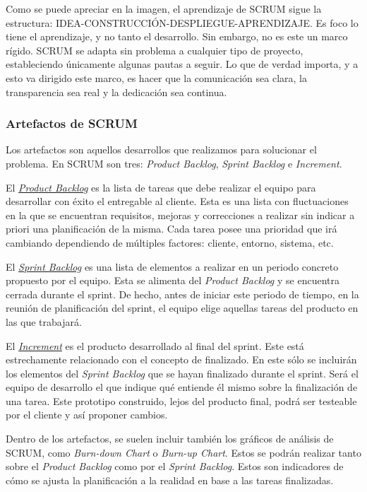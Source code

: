 
Como se puede apreciar en la imagen, el aprendizaje de SCRUM sigue la estructura: IDEA-CONSTRUCCIÓN-DESPLIEGUE-APRENDIZAJE. Es foco lo tiene el aprendizaje, y no tanto el desarrollo. Sin embargo, no es este un marco rígido. SCRUM se adapta sin problema a cualquier tipo de proyecto, estableciendo únicamente algunas pautas a seguir. Lo que de verdad importa, y a esto va dirigido este marco, es hacer que la comunicación sea clara, la transparencia sea real y la dedicación sea continua.

\subsubsection{Artefactos de SCRUM}
Los artefactos son aquellos desarrollos que realizamos para solucionar el problema. En SCRUM son tres: \textit{Product Backlog}, \textit{Sprint Backlog} e \textit{Increment}.

El \underline{\textit{Product Backlog}} es la lista de tareas que debe realizar el equipo para desarrollar con éxito el entregable al cliente. Esta es una lista con fluctuaciones en la que se encuentran requisitos, mejoras y correcciones a realizar sin indicar a priori una planificación de la misma. Cada tarea posee una prioridad que irá cambiando dependiendo de múltiples factores: cliente, entorno, sistema, etc.

El \underline{\textit{Sprint Backlog}} es una lista de elementos a realizar en un periodo concreto propuesto por el equipo. Esta se alimenta del \textit{Product Backlog} y se encuentra cerrada durante el sprint. De hecho, antes de iniciar este periodo de tiempo, en la reunión de planificación del sprint, el equipo elige aquellas tareas del producto en las que trabajará.

El \underline{\textit{Increment}} es el producto desarrollado al final del sprint. Este está estrechamente relacionado con el concepto de finalizado. En este sólo se incluirán los elementos del \textit{Sprint Backlog} que se hayan finalizado durante el sprint. Será el equipo de desarrollo el que indique qué entiende él mismo sobre la finalización de una tarea. Este prototipo construido, lejos del producto final, podrá ser testeable por el cliente y así proponer cambios.

Dentro de los artefactos, se suelen incluir también los gráficos de análisis de SCRUM, como \textit{Burn-down Chart} o \textit{Burn-up Chart}. Estos se podrán realizar tanto sobre el \textit{Product Backlog} como por el \textit{Sprint Backlog}. Estos son indicadores de cómo se ajusta la planificación a la realidad en base a las tareas finalizadas.

